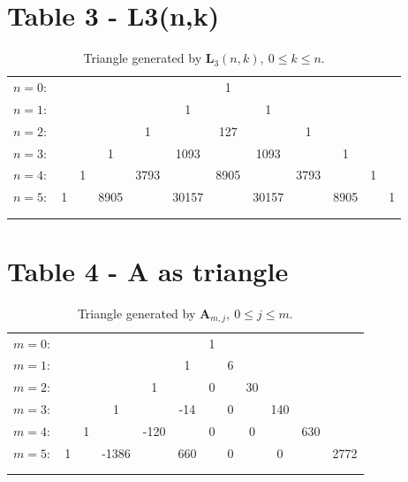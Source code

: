 \documentclass[12pt, letterpaper]{amsart}
\theoremstyle{definition}
\theoremstyle{remark}
\numberwithin{equation}{section}
\begin{document}
\section{Table 3 - L3(n,k)}
\begin{table}[H]
\begin{tabular}{rccccccccccc}
$n=0:$&  &    &    &    &    &  1 &    &    &    &    &   \\\noalign{\smallskip\smallskip}
$n=1:$&  &    &    &    &  1 &    &  1 &    &    &    &   \\\noalign{\smallskip\smallskip}
$n=2:$&  &    &    &  1 &    &  127 &    &  1 &    &    &   \\\noalign{\smallskip\smallskip}
$n=3:$&  &    &  1 &    &  1093 &    &  1093 &    &  1 &    &   \\\noalign{\smallskip\smallskip}
$n=4:$&  &  1 &    &  3793 &    &  8905 &    &  3793 &    &  1 &   \\\noalign{\smallskip\smallskip}
$n=5:$&1 &    &  8905 &    & 30157 &    & 30157 &    &  8905 &    & 1 \\\noalign{\smallskip\smallskip}
\\\noalign{\smallskip\smallskip}
\end{tabular}
\caption{Triangle generated by $\mathbf{L}_3(n,k), \ 0\leq k\leq n$.} \label{fig_3}
\end{table}
\section{Table 4 - A as triangle}

\begin{table}[H]
\begin{tabular}{rccccccccccc}
$m=0:$&  &    &    &    &    &  1 &    &    &    &    &   \\\noalign{\smallskip\smallskip}
$m=1:$&  &    &    &    &  1 &    &  6 &    &    &    &   \\\noalign{\smallskip\smallskip}
$m=2:$&  &    &    &  1 &    &  0 &    &  30 &    &    &   \\\noalign{\smallskip\smallskip}
$m=3:$&  &    &  1 &    &  -14 &    &  0 &    &  140 &    &   \\\noalign{\smallskip\smallskip}
$m=4:$&  &  1 &    &  -120 &    &  0 &    &  0 &    &  630 &   \\\noalign{\smallskip\smallskip}
$m=5:$&1 &    &  -1386 &    & 660 &    & 0 &    &  0 &    & 2772 \\\noalign{\smallskip\smallskip}
\\\noalign{\smallskip\smallskip}
\end{tabular}
\caption{Triangle generated by $\mathbf{A}_{m,j}, \ 0\leq j \leq m$.} \label{fig_4}
\end{table}
\end{document}
